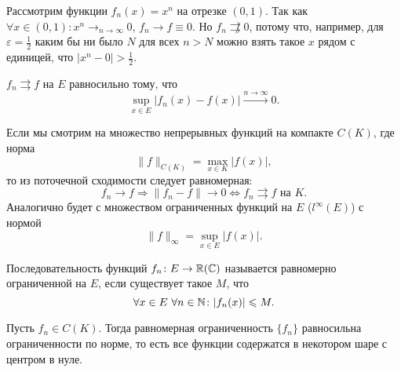 \documentclass[11pt,dvipsnames]{report}
\begin{document}
\begin{ex}
    Рассмотрим функции $ f_n(x) = x^{n}$ на отрезке $ (0, 1)$. Так как $ \forall x \in  (0, 1)\colon  x^{n} \mathrel{\rightarrow}_{n \to  \infty} 0$, $ f_n \to  f \equiv 0$. Но $ f_n \not\rightrightarrows 0$, потому что, например, для  $ \varepsilon = \frac{1}{2}$ каким бы ни было $ N$ для всех $ n > N$ можно взять такое $ x$ рядом с единицей, что  $ \lvert x^{n}-0 \rvert > \frac{1}{2}$.
\end{ex}

\begin{st}
    $ f_n \rightrightarrows f$ на $ E$ равносильно тому, что
     \[
	 \sup_{x \in E} \lvert f_n(x)-f(x) \rvert \stackrel{n \to  \infty} \longrightarrow 0
    .\] 
\end{st}
\begin{rem}
    Если мы смотрим на множество непрерывных функций на компакте $ C(K)$, где норма 
    \[
	\| f \| _{C(K)} = \max_{x \in  K} \lvert f(x) \rvert 
    ,\] 
    то из поточечной сходимости следует равномерная:
    \[
    f_{n} \to  f \Longrightarrow \| f_n - f \| \to  0 \Longleftrightarrow f_n \rightrightarrows f \text{ на }  K
    .\] 
    Аналогично будет с множеством ограниченных функций на $ E$ ($ l^{\infty}(E)$) с нормой 
    \[
	\| f \| _{\infty}  = \sup_{x \in E}\lvert f(x) \rvert 
    .\] 
\end{rem}

\begin{defn}
    Последовательность функций $ f_n \colon E \to \mathbb{R} (\mathbb{C})$ называется {\sf равномерно ограниченной на $ E$}, если существует такое $ M$, что
    \[
	\forall x \in E ~ \forall n \in \mathbb{N} \colon \lvert f_n(x) \rvert \leqslant M
    .\] 
\end{defn}

\begin{ex}
    Пусть $ f_n \in C(K)$. Тогда равномерная ограниченность $ \{f_n\}$ равносильна ограниченности по норме, то есть все функции содержатся в некотором шаре с центром в нуле.
\end{ex}
\end{document}
